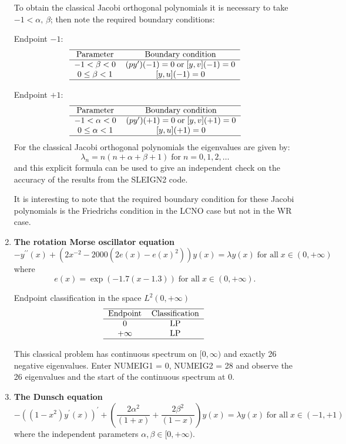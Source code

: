 \documentclass[12pt]{amsart}%
\theoremstyle{plain}
\numberwithin{equation}{section}
\begin{document}
\begin{enumerate}
To obtain the classical Jacobi orthogonal polynomials it is necessary to take
$-1<\alpha,\,\beta$; then note the required boundary conditions:

Endpoint $-1$:%
\[%
\begin{tabular}
[c]{cc}\hline
Parameter & Boundary condition\\\hline
$-1<\beta<0$ & $(py^{\prime})(-1)=0\;$or$\;[y,v](-1)=0$\\
$0\leq\beta<1$ & $[y,u](-1)=0$\\\hline
\end{tabular}
\]

Endpoint $+1$:%
\[%
\begin{tabular}
[c]{cc}\hline
Parameter & Boundary condition\\\hline
$-1<\alpha<0$ & $(py^{\prime})(+1)=0\;$or$\;[y,v](+1)=0$\\
$0\leq\alpha<1$ & $[y,u](+1)=0$\\\hline
\end{tabular}
\]
\newline For the classical Jacobi orthogonal polynomials the eigenvalues are
given by:
\[
\lambda_{n}=n(n+\alpha+\beta+1)\;\text{for}\;n=0,1,2,\ldots
\]
and this explicit formula can be used to give an independent check on the
accuracy of the results from the SLEIGN2 code.

It is interesting to note that the required boundary condition for these
Jacobi polynomials is the Friedrichs condition in the LCNO case but not in the
WR case.

\item \textbf{The rotation Morse oscillator equation}%
\[
-y^{\prime\prime}(x)+(2x^{-2}-2000(2e(x)-e(x)^{2}))y(x)=\lambda
y(x)\;\text{for all}\;x\in(0,+\infty)
\]
where%
\[
e(x)=\exp(-1.7(x-1.3))\;\text{for all}\;x\in(0,+\infty).
\]

Endpoint classification in the space $L^{2}(0,+\infty)$%
\[%
\begin{tabular}
[c]{cc}\hline
Endpoint & Classification\\\hline
$0$ & LP\\
$+\infty$ & LP\\\hline
\end{tabular}
\
\]

This classical problem has continuous spectrum on $[0,\infty)$ and exactly 26
negative eigenvalues. Enter NUMEIG1 = 0, NUMEIG2 = 28 and observe the 26
eigenvalues and the start of the continuous spectrum at 0.

\item \textbf{The Dunsch equation}%
\[
-\left(  (1-x^{2})y^{\prime}(x)\right)  ^{\prime}+\left(  \frac{2\alpha^{2}%
}{(1+x)}+\frac{2\beta^{2}}{(1-x)}\right)  y(x)=\lambda y(x)\;\text{for
all}\;x\in(-1,+1)
\]
where the independent parameters $\alpha,\beta\in\lbrack0,+\infty).$


\end{enumerate}
\end{document}
